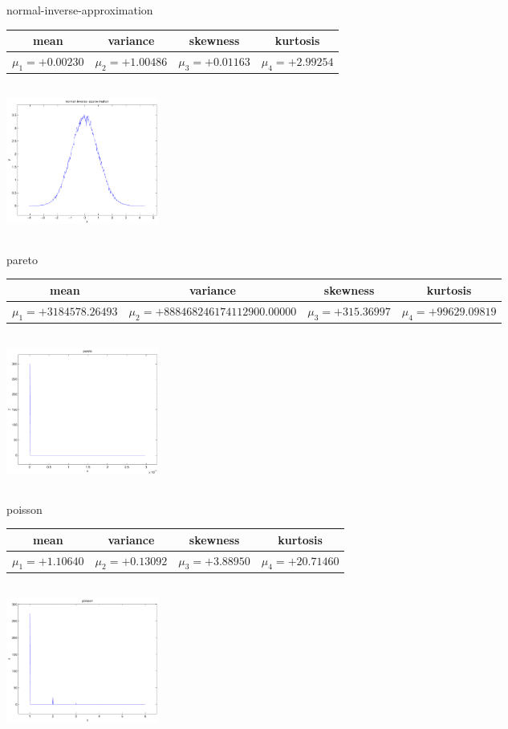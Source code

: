 \documentclass[9pt]{article}
\theoremstyle{plain}
\theoremstyle{definition}
\theoremstyle{remark}
\numberwithin{equation}{section}
\begin{document}
\newpage
normal-inverse-approximation \begin{tabular}{|c|c|c|c|}  mean & variance & skewness & kurtosis \\  \hline
$\mu_1 = +0.00230$ & $\mu_2 = +1.00486$ & $\mu_3 = +0.01163$ & $\mu_4 =+2.99254$ \\
\end{tabular}

\includegraphics[width=5cm,height=5cm]{normal-inverse-approximation.pdf}

pareto \begin{tabular}{|c|c|c|c|}  mean & variance & skewness & kurtosis \\  \hline
$\mu_1 = +3184578.26493$ & $\mu_2 = +888468246174112900.00000$ & $\mu_3 = +315.36997$ & $\mu_4 =+99629.09819$ \\
\end{tabular}

\includegraphics[width=5cm,height=5cm]{pareto.pdf}

poisson \begin{tabular}{|c|c|c|c|}  mean & variance & skewness & kurtosis \\  \hline
$\mu_1 = +1.10640$ & $\mu_2 = +0.13092$ & $\mu_3 = +3.88950$ & $\mu_4 =+20.71460$ \\
\end{tabular}

\includegraphics[width=5cm,height=5cm]{poisson.pdf}
\end{document}
